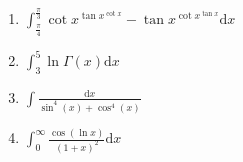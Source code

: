 \documentclass[11pt, a4paper]{article}
\newcommand{\dd}{\mathrm{d}}
\begin{document}
\begin{enumerate}
    \item $\int_{\frac{\pi}{4}}^{\frac{\pi}{3}}  \cot{x}^{\tan{x}^{\cot{x}}}-\tan{x}^{\cot{x}^{\tan{x}}} \dd x$ 
    \item $\int_3^5 \ln{\Gamma(x)} \dd x$ 
    \item $\int \frac{\dd x}{\sin^4(x)+\cos^4(x)}$ 
    \item $\int_0^{\infty} \frac{\cos(\ln{x})}{(1+x)^2} \dd x$ 
    
    \end{enumerate}
\end{document}
